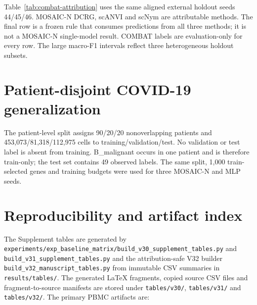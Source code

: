 \documentclass[10pt]{article}
\begin{document}
Table~\ref{tab:combat-attribution} uses the same aligned external holdout seeds 44/45/46. MOSAIC-N DCRG, scANVI and scNym are attributable methods. The final row is a frozen rule that consumes predictions from all three methods; it is not a MOSAIC-N single-model result. COMBAT labels are evaluation-only for every row. The large macro-F1 intervals reflect three heterogeneous holdout subsets.

\begin{table}[H]
\centering
\caption{COMBAT/COVID parent-safe performance with single methods separated from the cross-method consensus. Values are mean $\pm$ 95\% Student-$t$ margin over three aligned holdout seeds.}
\label{tab:combat-attribution}
\small

\end{table}

\section{Patient-disjoint COVID-19 generalization}

The patient-level split assigns 90/20/20 nonoverlapping patients and 453,073/81,318/112,975 cells to training/validation/test. No validation or test label is absent from training. B\_malignant occurs in one patient and is therefore train-only; the test set contains 49 observed labels. The same split, 1,000 train-selected genes and training budgets were used for three MOSAIC-N and MLP seeds.

\begin{table}[H]
\centering
\caption{Paired patient-disjoint COVID-19 results over three model seeds.}
\label{tab:patient-generalization}
\small

\end{table}

\section{Reproducibility and artifact index}

The Supplement tables are generated by
\texttt{experiments/exp\_baseline\_matrix/build\_v30\_supplement\_tables.py} and
\texttt{build\_v31\_supplement\_tables.py} and the attribution-safe V32 builder
\texttt{build\_v32\_manuscript\_tables.py} from immutable CSV summaries in
\texttt{results/tables/}. The generated LaTeX fragments, copied source CSV files and fragment-to-source manifests are stored under \texttt{tables/v30/}, \texttt{tables/v31/} and \texttt{tables/v32/}. The primary PBMC artifacts are:
\end{document}
